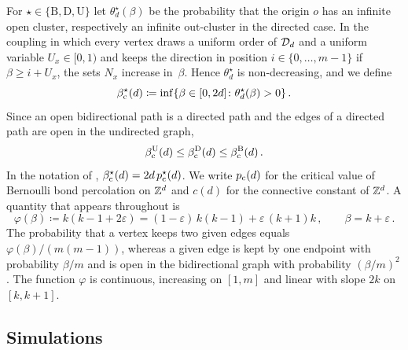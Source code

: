 \documentclass[11pt,letterpaper]{article}
\begin{document}
For $\star\in\{\mathrm B,\mathrm D,\mathrm U\}$ let $\theta^{\star}_d(\beta)$ be the probability that the origin $o$ has an infinite open cluster, respectively an infinite out-cluster in the directed case. In the coupling in which every vertex draws a uniform order of $\mathcal D_d$ and a uniform variable $U_x\in[0,1)$ and keeps the direction in position $i\in\{0,\dots,m-1\}$ if $\beta\ge i+U_x$, the sets $N_x$ increase in~$\beta$. Hence $\theta^{\star}_d$ is non-decreasing, and we define
\begin{equation*}
\beta_{\mathrm c}^{\star}(d)\coloneqq\inf\{\beta\in[0,2d]\colon\theta^{\star}_d(\beta)>0\}\,.
\end{equation*}
Since an open bidirectional path is a directed path and the edges of a directed path are open in the undirected graph,
\begin{equation}\label{eq:order}
\beta_{\mathrm c}^{\mathrm U}(d)\le\beta_{\mathrm c}^{\mathrm D}(d)\le\beta_{\mathrm c}^{\mathrm B}(d)\,.
\end{equation}
In the notation of \cite{BJKLRT25}, $\beta_{\mathrm c}^{\star}(d)=2d\,p^{\star}_{\mathrm c}(d)$. We write $p_{\mathrm c}(d)$ for the critical value of Bernoulli bond percolation on $\mathbb Z^d$ and $c(d)$ for the connective constant of $\mathbb Z^d$. A quantity that appears throughout is
\begin{equation*}
\varphi(\beta)\coloneqq k(k-1+2\varepsilon)=(1-\varepsilon)\,k(k-1)+\varepsilon\,(k+1)k\,,\qquad\beta=k+\varepsilon\,.
\end{equation*}
The probability that a vertex keeps two given edges equals $\varphi(\beta)/(m(m-1))$, whereas a given edge is kept by one endpoint with probability $\beta/m$ and is open in the bidirectional graph with probability $(\beta/m)^2$. The function $\varphi$ is continuous, increasing on $[1,m]$ and linear with slope $2k$ on $[k,k+1]$.

\subsection{Simulations}
\end{document}
